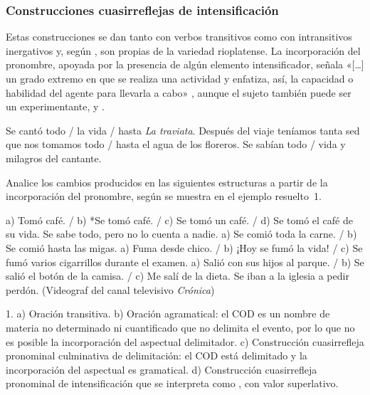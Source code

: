\subsubsection{Construcciones cuasirreflejas de intensificación}\label{sec:10-intensificacion}

Estas construcciones se dan tanto con verbos transitivos como con intransitivos
inergativos y, según \textcite{ditullio2014}, son propias de la variedad
rioplatense. La incorporación del pronombre, apoyada por la presencia de algún
elemento intensificador, señala «[\ldots] un grado extremo en que se realiza una
actividad y enfatiza, así, la capacidad o habilidad del agente para llevarla a
cabo» \parencite[181]{ditullio2014} , aunque el sujeto
también puede ser un experimentante,  y
.

\begin{exe}
  \ex\label{ex:10-traviata} Se cantó todo / la vida / hasta \textit{La
      traviata}.
  \ex\label{ex:10-floreros} Después del viaje teníamos tanta sed que nos tomamos
      todo / hasta el agua de los floreros.
  \ex\label{ex:10-sabian} Se sabían todo / vida y milagros del cantante.
\end{exe}

\begin{ejercicio}\label{ej:10-intensificacion}
Analice los cambios producidos en las siguientes estructuras a partir de la
incorporación del pronombre, según se muestra en el ejemplo resuelto~1.

\begin{exe}
  \ex a) Tomó café. / b) *Se tomó café. / c) Se tomó un café. / d) Se tomó el
      café de su vida.
  \ex Se sabe todo, pero no lo cuenta a nadie.
  \ex a) Se comió toda la carne. / b) Se comió hasta las migas.
  \ex a) Fuma desde chico. / b) ¡Hoy se fumó la vida! / c) Se fumó varios
      cigarrillos durante el examen.
  \ex a) Salió con sus hijos al parque. / b) Se salió el botón de la camisa. /
      c) Me salí de la dieta.
  \ex Se iban a la iglesia a pedir perdón. (Videograf del canal televisivo
      \textit{Crónica})
\end{exe}

\begin{resuelto}
1. a) Oración transitiva. b) Oración agramatical: el COD es un nombre de materia
no determinado ni cuantificado que no delimita el evento, por lo que no es
posible la incorporación del  aspectual delimitador. c) Construcción
cuasirrefleja pronominal culminativa de delimitación: el COD está delimitado y
la incorporación del  aspectual es gramatical. d) Construcción
cuasirrefleja pronominal de intensificación que se interpreta como , con valor superlativo.
\end{resuelto}
\end{ejercicio}

